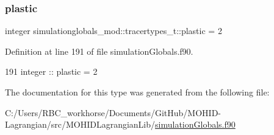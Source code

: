 \subsubsection{\texorpdfstring{plastic}{plastic}}
{\footnotesize\ttfamily integer simulationglobals\+\_\+mod\+::tracertypes\+\_\+t\+::plastic = 2\hspace{0.3cm}{\ttfamily [private]}}



Definition at line 191 of file simulation\+Globals.\+f90.


\begin{DoxyCode}
191         \textcolor{keywordtype}{integer} :: plastic = 2
\end{DoxyCode}


The documentation for this type was generated from the following file\+:\begin{DoxyCompactItemize}
\item 
C\+:/\+Users/\+R\+B\+C\+\_\+workhorse/\+Documents/\+Git\+Hub/\+M\+O\+H\+I\+D-\/\+Lagrangian/src/\+M\+O\+H\+I\+D\+Lagrangian\+Lib/\mbox{\hyperlink{simulation_globals_8f90}{simulation\+Globals.\+f90}}\end{DoxyCompactItemize}
